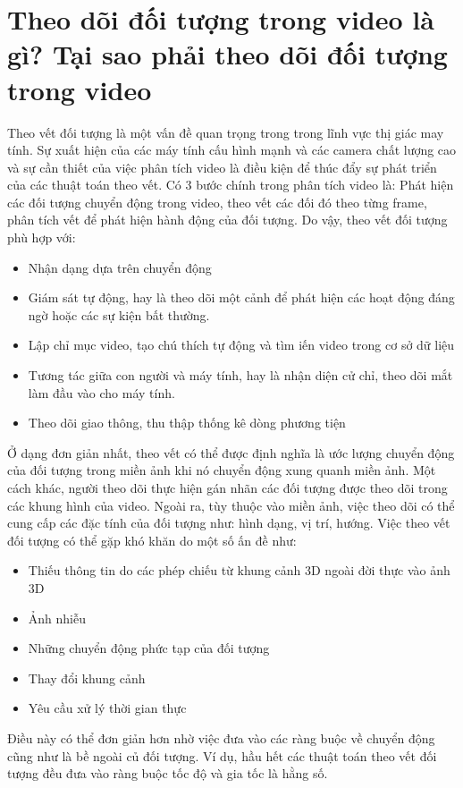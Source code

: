 \documentclass[12pt,oneside,a4]{report}
\begin{document}
\section{Theo dõi đối tượng trong video là gì? Tại sao phải theo dõi đối tượng trong video}
Theo vết đối tượng là một vấn đề quan trọng trong trong lĩnh vực thị giác may tính. Sự xuất hiện của các máy tính cấu hình mạnh và các camera chất lượng cao và sự cần thiết của việc phân tích video  là điều kiện để thúc đẩy sự phát triển của các thuật toán theo vết. Có 3 bước chính trong phân tích video là: Phát hiện các đối tượng chuyển động trong video, theo vết các đối đó theo từng frame, phân tích vết để phát hiện hành động của đối tượng. Do vậy, theo vết đối tượng phù hợp với: 
\begin{itemize}
\item Nhận dạng dựa trên chuyển động
\item Giám sát tự động, hay là theo dõi một cảnh để phát hiện các hoạt động đáng ngờ hoặc các sự kiện bất thường.
\item Lập chỉ mục video, tạo chú thích tự động và tìm iến video trong cơ sở dữ liệu
\item Tương tác giữa con người và máy tính, hay là nhận diện cử chỉ, theo dõi mắt làm đầu vào cho máy tính. 
\item Theo dõi giao thông, thu thập thống kê dòng phương tiện
\end{itemize}
Ở dạng đơn giản nhất, theo vết có thể được định nghĩa là ước lượng chuyển động của đối tượng trong miền ảnh khi nó chuyển động xung quanh miền ảnh. Một cách khác, người theo dõi thực hiện gán nhãn các đối tượng được theo dõi trong các khung hình của video. Ngoài ra, tùy thuộc vào miền ảnh, việc theo dõi có thể cung cấp các đặc tính của đối tượng như: hình dạng, vị trí, hướng. Việc theo vết đối tượng có thể gặp khó khăn do một số ấn đề như: 
\begin{itemize}
\item Thiếu thông tin do các phép chiếu từ khung cảnh 3D ngoài đời thực vào ảnh 3D
\item Ảnh nhiễu
\item Những chuyển động phức tạp của đối tượng
\item Thay đổi khung cảnh
\item Yêu cầu xử lý thời gian thực
\end{itemize} 
Điều này có thể đơn giản hơn nhờ việc đưa vào các ràng buộc về chuyển động cũng như là bề ngoài củ đối tượng. Ví dụ, hầu hết các thuật toán theo vết đối tượng đều đưa vào ràng buộc tốc độ và gia tốc là hằng số. 
\end{document}
